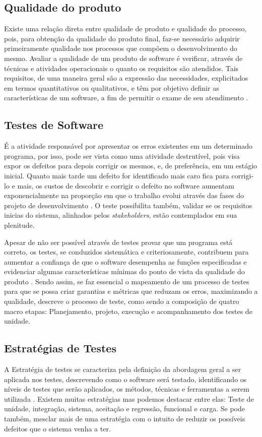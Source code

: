 \documentclass[tg]{mdtufsm}
\begin{document}
\subsection{Qualidade do produto}
Existe uma relação direta entre qualidade de produto e qualidade do processo, pois, para obtenção da qualidade do produto final,
faz-se necessário adquirir primeiramente qualidade nos processos que compõem o desenvolvimento do mesmo.
Avaliar a qualidade de um produto de software é verificar, através de técnicas e atividades operacionais o quanto os requisitos são atendidos. Tais requisitos,
de uma maneira geral são a expressão das necessidades, explicitados em termos quantitativos ou qualitativos, e têm por objetivo definir as características de
um software, a fim de permitir o exame de seu atendimento \cite{koscianski2007qualidade}.

\subsection{Testes de Software}
É a atividade responsável por apresentar os erros existentes em um determinado programa, por isso, pode ser vista como uma atividade destrutível, pois visa expor os defeitos para depois corrigir os mesmos, e, de preferência, em
um estágio inicial. Quanto mais tarde um defeito for identificado mais caro fica para corrigi-lo e mais, os custos de descobrir e corrigir o defeito no software aumentam exponencialmente na proporção em que o trabalho
evolui através das fases do projeto de desenvolvimento \cite{boehm1976quantitative}. O teste possibilita também, validar se os requisitos inicias do sistema, alinhados pelos \emph{stakeholders}, estão contemplados em sua plenitude.

Apesar de não ser possível através de testes provar que um programa está correto, os testes, se conduzidos sistemática e criteriosamente, contribuem para
aumentar a confiança de que o software desempenha as funções especificadas e evidenciar algumas características mínimas do ponto de vista da qualidade do produto \cite{maldonado2004introduccao}. Sendo assim,
se faz essencial o mapeamento de um processo de testes para que se possa criar garantias e métricas que reduzam os erros, maximizando a qualidade, \citeauthor{crespo2004metodologia} \cite{crespo2004metodologia} descreve o processo de
teste, como sendo a composição de quatro macro etapas: Planejamento, projeto, execução e acompanhamento dos testes de unidade.

\subsection{Estratégias de Testes}
A Estratégia de testes se caracteriza pela definição da abordagem geral a ser aplicada nos testes, descrevendo como o software será testado, identificando os níveis de testes que serão aplicados, os métodos,
técnicas e ferramentas a serem utilizada \cite{rios2006teste}. Existem muitas estratégias mas podemos destacar entre elas: Teste de unidade, integração, sistema, aceitação e regressão, funcional e carga. Se pode também,
mesclar mais de uma estratégia com o intuito de reduzir os possíveis defeitos que o sistema venha a ter.
\end{document}
